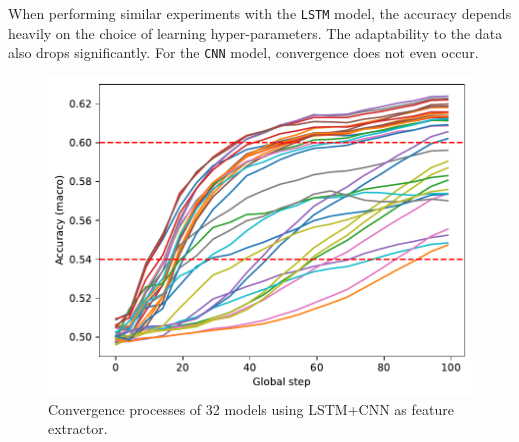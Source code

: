 \documentclass[aps,prb,groupedaddress,twocolumn,showpacs,dvipdfmx,superscriptaddress,pdftex]{revtex4-2}
\begin{document}
\vspace{2mm}


When performing similar experiments with the \verb|LSTM| model, the accuracy depends heavily on the choice of learning hyper-parameters. The adaptability to the data also drops significantly. For the \verb|CNN| model, convergence does not even occur.

\begin{figure}[h]
    \centering
    \includegraphics[width=\linewidth]{img/lr.pdf}
    \caption{Convergence processes of 32 models using LSTM+CNN as feature extractor.}
    \label{fig:lr}
\end{figure}

\vspace{2mm}

\end{document}
